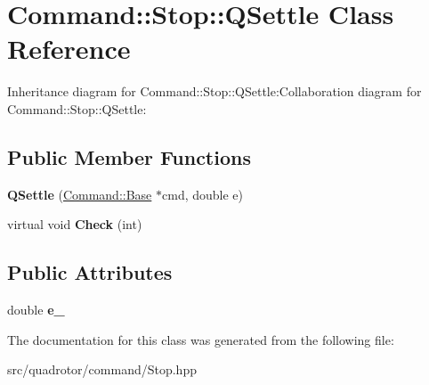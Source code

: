 \hypertarget{classCommand_1_1Stop_1_1QSettle}{
\section{Command::Stop::QSettle Class Reference}
\label{classCommand_1_1Stop_1_1QSettle}
}
Inheritance diagram for Command::Stop::QSettle:Collaboration diagram for Command::Stop::QSettle:\subsection*{Public Member Functions}
\begin{DoxyCompactItemize}
\item 
\hypertarget{classCommand_1_1Stop_1_1QSettle_a36fc1f9244be5b81c8833243146e1ae9}{
{\bfseries QSettle} (\hyperlink{classCommand_1_1Base}{Command::Base} $\ast$cmd, double e)}
\label{classCommand_1_1Stop_1_1QSettle_a36fc1f9244be5b81c8833243146e1ae9}

\item 
\hypertarget{classCommand_1_1Stop_1_1QSettle_a3c2e37dbd4fdf4cc45fea9014d6cde8e}{
virtual void {\bfseries Check} (int)}
\label{classCommand_1_1Stop_1_1QSettle_a3c2e37dbd4fdf4cc45fea9014d6cde8e}

\end{DoxyCompactItemize}
\subsection*{Public Attributes}
\begin{DoxyCompactItemize}
\item 
\hypertarget{classCommand_1_1Stop_1_1QSettle_afc557df6532a4071566db3481abd9cb6}{
double {\bfseries e\_\-}}
\label{classCommand_1_1Stop_1_1QSettle_afc557df6532a4071566db3481abd9cb6}

\end{DoxyCompactItemize}


The documentation for this class was generated from the following file:\begin{DoxyCompactItemize}
\item 
src/quadrotor/command/Stop.hpp\end{DoxyCompactItemize}
